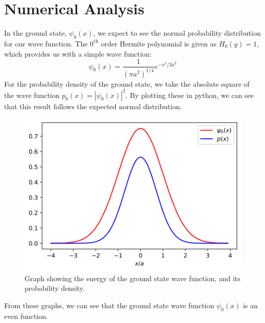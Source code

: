 \documentclass[a4paper]{article}
\begin{document}
\section{Numerical Analysis}
In the ground state, $\psi_0(x)$, we expect to see the normal probability distribution for our wave function. The $0^\text{th}$ order Hermite polynomial is given as $H_0(y)=1$, which provides us with a simple wave function:
\begin{equation}
\psi_0(x)=\frac1{(\pi a^2)^{1/4}}e^{-x^2/2a^2}
\end{equation}
For the probability density of the ground state, we take the absolute square of the wave function $p_0(x)=|\psi_0(x)|^2$. By plotting these in python, we can see that this result follows the expected normal distribution.
\begin{figure}[h!]
\centerline{\includegraphics[scale=0.7]{ground_state.png}}
\caption{Graph showing the energy of the ground state wave function, and its probability density.}
\label{fig:ground_state}
\end{figure}
From these graphs, we can see that the ground state wave function $\psi_0(x)$ is an even function.
\end{document}
